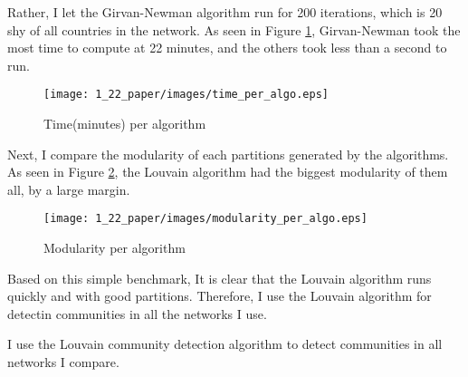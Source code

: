 \documentclass[a4paper, 12pt]{article}
\begin{document}
Rather, I let the Girvan-Newman algorithm run for 200 iterations, which is 20 shy of all countries in the network.
As seen in Figure \ref{fig:time_per_algo}, Girvan-Newman took the most time to compute at 22 minutes, and the others took less than a second to run.
\begin{figure}[H]
    \centering
    \texttt{[image: 1\_22\_paper/images/time\_per\_algo.eps]}
    \caption{Time(minutes) per algorithm}
    \label{fig:time_per_algo}
\end{figure}
Next, I compare the modularity of each partitions generated by the algorithms.
As seen in Figure \ref{fig:mod_per_algo}, the Louvain algorithm had the  biggest modularity of them all, by a large margin.
\begin{figure}[H]
    \centering
    \texttt{[image: 1\_22\_paper/images/modularity\_per\_algo.eps]}
    \caption{Modularity per algorithm}
    \label{fig:mod_per_algo}
\end{figure}
Based on this simple benchmark, It is clear that the Louvain algorithm runs quickly and with good partitions.
Therefore, I use the Louvain algorithm for detectin communities in all the networks I use.




I use the Louvain community detection algorithm to detect communities in all networks I compare.
\newpage
\end{document}
